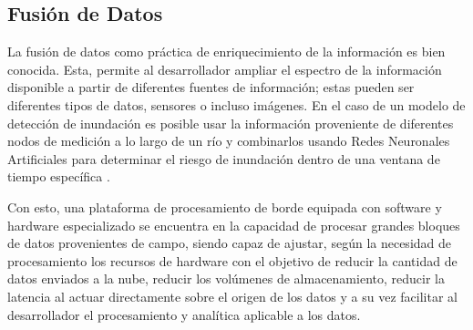 \subsection{Fusión de Datos}

La fusión de datos como práctica de enriquecimiento de la información es bien conocida. Esta, permite al desarrollador ampliar el espectro de la información disponible a partir de diferentes fuentes de información; estas pueden ser diferentes tipos de datos, sensores o incluso imágenes. En el caso de un modelo de detección de inundación es posible usar la información proveniente de diferentes nodos de medición a lo largo de un río y combinarlos usando Redes Neuronales Artificiales para determinar el riesgo de inundación dentro de una ventana de tiempo específica \cite{ANN1,ANN2,ANN3}.

Con esto, una plataforma de procesamiento de borde equipada con software y hardware especializado \iffalse como el propuesto en este proyecto \fi se encuentra en la capacidad de procesar grandes bloques de datos provenientes de campo, siendo capaz de ajustar, según la necesidad de procesamiento los recursos de hardware con el objetivo de reducir la cantidad de datos enviados a la nube, reducir los volúmenes de almacenamiento, reducir la latencia al actuar directamente sobre el origen de los datos y a su vez facilitar al desarrollador el procesamiento y analítica aplicable a los datos.